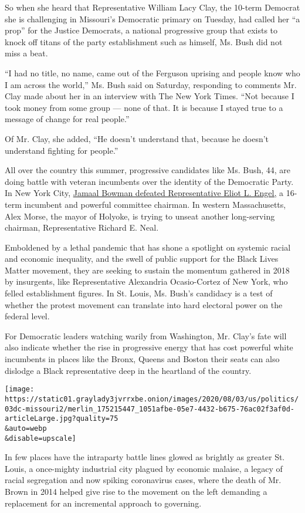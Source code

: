 So when she heard that Representative William Lacy Clay, the 10-term
Democrat she is challenging in Missouri's Democratic primary on Tuesday,
had called her ``a prop'' for the Justice Democrats, a national
progressive group that exists to knock off titans of the party
establishment such as himself, Ms. Bush did not miss a beat.

``I had no title, no name, came out of the Ferguson uprising and people
know who I am across the world,'' Ms. Bush said on Saturday, responding
to comments Mr. Clay made about her in an interview with The New York
Times. ``Not because I took money from some group --- none of that. It
is because I stayed true to a message of change for real people.''

Of Mr. Clay, she added, ``He doesn't understand that, because he doesn't
understand fighting for people.''

All over the country this summer, progressive candidates like Ms. Bush,
44, are doing battle with veteran incumbents over the identity of the
Democratic Party. In New York City,
\href{https://www.nytimes3xbfgragh.onion/2020/07/17/nyregion/jamaal-bowman-eliot-engel.html}{Jamaal
Bowman defeated Representative Eliot L. Engel,} a 16-term incumbent and
powerful committee chairman. In western Massachusetts, Alex Morse, the
mayor of Holyoke, is trying to unseat another long-serving chairman,
Representative Richard E. Neal.

Emboldened by a lethal pandemic that has shone a spotlight on systemic
racial and economic inequality, and the swell of public support for the
Black Lives Matter movement, they are seeking to sustain the momentum
gathered in 2018 by insurgents, like Representative Alexandria
Ocasio-Cortez of New York, who felled establishment figures. In St.
Louis, Ms. Bush's candidacy is a test of whether the protest movement
can translate into hard electoral power on the federal level.

For Democratic leaders watching warily from Washington, Mr. Clay's fate
will also indicate whether the rise in progressive energy that has cost
powerful white incumbents in places like the Bronx, Queens and Boston
their seats can also dislodge a Black representative deep in the
heartland of the country.

\texttt{[image: https://static01.graylady3jvrrxbe.onion/images/2020/08/03/us/politics/03dc-missouri2/merlin\_175215447\_1051afbe-05e7-4432-b675-76ac02f3af0d-articleLarge.jpg?quality=75\\\&auto=webp\\\&disable=upscale]}

In few places have the intraparty battle lines glowed as brightly as
greater St. Louis, a once-mighty industrial city plagued by economic
malaise, a legacy of racial segregation and now spiking coronavirus
cases, where the death of Mr. Brown in 2014 helped give rise to the
movement on the left demanding a replacement for an incremental approach
to governing.

